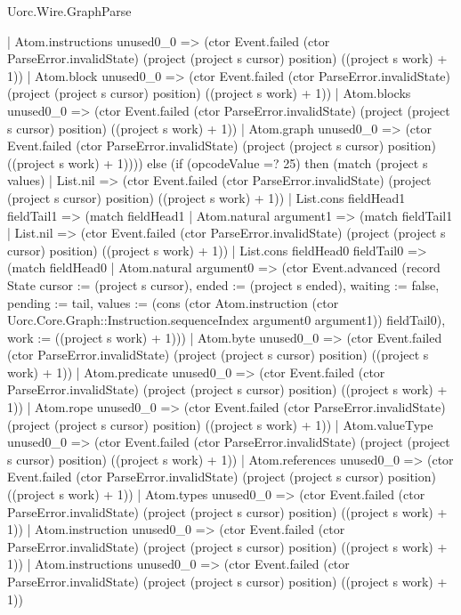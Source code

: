 \begin{lexlean}{Uorc.Wire.GraphParse}
\begin{semanticmodule}
{          | Atom.instructions unused0_0 => (ctor Event.failed (ctor ParseError.invalidState) (project (project s cursor) position) ((project s work) + 1))
          | Atom.block unused0_0 => (ctor Event.failed (ctor ParseError.invalidState) (project (project s cursor) position) ((project s work) + 1))
          | Atom.blocks unused0_0 => (ctor Event.failed (ctor ParseError.invalidState) (project (project s cursor) position) ((project s work) + 1))
          | Atom.graph unused0_0 => (ctor Event.failed (ctor ParseError.invalidState) (project (project s cursor) position) ((project s work) + 1)))) else (if (opcodeValue =? 25) then (match (project s values)
        | List.nil => (ctor Event.failed (ctor ParseError.invalidState) (project (project s cursor) position) ((project s work) + 1))
        | List.cons fieldHead1 fieldTail1 => (match fieldHead1
          | Atom.natural argument1 => (match fieldTail1
            | List.nil => (ctor Event.failed (ctor ParseError.invalidState) (project (project s cursor) position) ((project s work) + 1))
            | List.cons fieldHead0 fieldTail0 => (match fieldHead0
              | Atom.natural argument0 => (ctor Event.advanced (record State {cursor := (project s cursor), ended := (project s ended), waiting := false, pending := tail, values := (cons (ctor Atom.instruction (ctor Uorc.Core.Graph::Instruction.sequenceIndex argument0 argument1)) fieldTail0), work := ((project s work) + 1)}))
              | Atom.byte unused0_0 => (ctor Event.failed (ctor ParseError.invalidState) (project (project s cursor) position) ((project s work) + 1))
              | Atom.predicate unused0_0 => (ctor Event.failed (ctor ParseError.invalidState) (project (project s cursor) position) ((project s work) + 1))
              | Atom.rope unused0_0 => (ctor Event.failed (ctor ParseError.invalidState) (project (project s cursor) position) ((project s work) + 1))
              | Atom.valueType unused0_0 => (ctor Event.failed (ctor ParseError.invalidState) (project (project s cursor) position) ((project s work) + 1))
              | Atom.references unused0_0 => (ctor Event.failed (ctor ParseError.invalidState) (project (project s cursor) position) ((project s work) + 1))
              | Atom.types unused0_0 => (ctor Event.failed (ctor ParseError.invalidState) (project (project s cursor) position) ((project s work) + 1))
              | Atom.instruction unused0_0 => (ctor Event.failed (ctor ParseError.invalidState) (project (project s cursor) position) ((project s work) + 1))
              | Atom.instructions unused0_0 => (ctor Event.failed (ctor ParseError.invalidState) (project (project s cursor) position) ((project s work) + 1))
}
\end{semanticmodule}
\end{lexlean}
